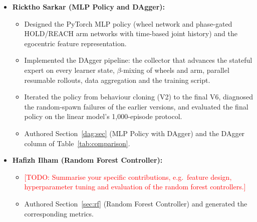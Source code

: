 \documentclass[conference]{IEEEtran}
\newcommand{\todo}[1]{\textcolor{red}{[TODO: #1]}}
\begin{document}
\begin{itemize}
    \vspace{0.4cm}
    \item \textbf{Ricktho Sarkar (MLP Policy and DAgger):}
    \begin{itemize}
        \item Designed the PyTorch MLP policy (wheel network and phase-gated HOLD/REACH arm networks with time-based joint history) and the egocentric feature representation.
        \item Implemented the DAgger pipeline: the collector that advances the stateful expert on every learner state, $\beta$-mixing of wheels and arm, parallel resumable rollouts, data aggregation and the training script.
        \item Iterated the policy from behaviour cloning (V2) to the final V6, diagnosed the random-spawn failures of the earlier versions, and evaluated the final policy on the linear model's 1,000-episode protocol.
        \item Authored Section~\ref{dag:sec} (MLP Policy with DAgger) and the DAgger column of Table~\ref{tab:comparison}.
    \end{itemize}

    \vspace{0.4cm}
    \item \textbf{Hafizh Ilham (Random Forest Controller):}
    \begin{itemize}
        \item \todo{Summarise your specific contributions, e.g.\ feature design, hyperparameter tuning and evaluation of the random forest controllers.}
        \item Authored Section~\ref{sec:rf} (Random Forest Controller) and generated the corresponding metrics.
    \end{itemize}
\end{itemize}
\end{document}
